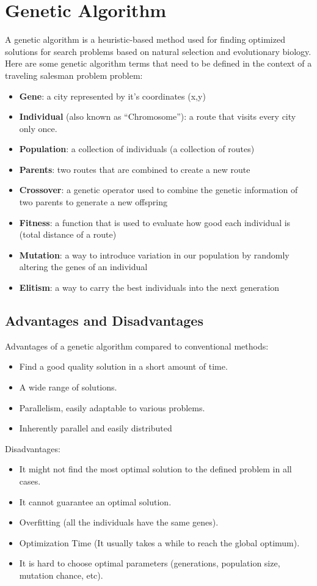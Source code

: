 \chapter{Genetic Algorithm}
A genetic algorithm is a heuristic-based method used for finding optimized solutions for search problems based on natural selection and evolutionary biology.\newline
Here are some genetic algorithm terms that need to be defined in the context of a traveling salesman problem problem:
\begin{itemize}
    \item \textbf{Gene}: a city represented by it's coordinates (x,y)
    \item \textbf{Individual} (also known as “Chromosome”): a route that visits every city only once.
    \item \textbf{Population}: a collection of individuals (a collection of routes)
    \item \textbf{Parents}: two routes that are combined to create a new route
    \item \textbf{Crossover}: a genetic operator used to combine the genetic information of two parents to generate a new offspring
    \item \textbf{Fitness}: a function that is used to evaluate how good each individual is (total distance of a route)
    \item \textbf{Mutation}: a way to introduce variation in our population by randomly altering the genes of an individual
    \item \textbf{Elitism}: a way to carry the best individuals into the next generation
\end{itemize}

\newpage
\section{Advantages and Disadvantages}
\noindent
Advantages of a genetic algorithm compared to conventional methods:
\begin{itemize}
    \item Find a good quality solution in a short amount of time.
    \item A wide range of solutions.
    \item Parallelism, easily adaptable to various problems.
    \item Inherently parallel and easily distributed
\end{itemize}
Disadvantages:
\begin{itemize}
    \item It might not find the most optimal solution to the defined problem in all cases.
    \item It cannot guarantee an optimal solution.
    \item Overfitting (all the individuals have the same genes).
    \item Optimization Time (It usually takes a while to reach the global optimum).
    \item It is hard to choose optimal parameters (generations, population size, mutation chance, etc).
\end{itemize}

